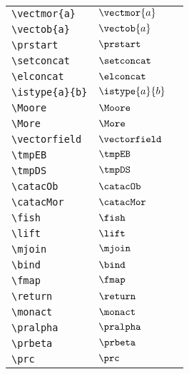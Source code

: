 \begin{longtable}{lll}
 {\color[rgb]{0.5,0.5,0.5}\texttt{\textbackslash vectmor\{a\}}} & $\vectmor{a}$ & \\ 
 {\color[rgb]{0.5,0.5,0.5}\texttt{\textbackslash vectob\{a\}}} & $\vectob{a}$ & \\ 
 {\color[rgb]{0.5,0.5,0.5}\texttt{\textbackslash prstart}} & $\prstart$ & \\ 
 {\color[rgb]{0.5,0.5,0.5}\texttt{\textbackslash setconcat}} & $\setconcat$ & \\ 
 {\color[rgb]{0.5,0.5,0.5}\texttt{\textbackslash elconcat}} & $\elconcat$ & \\ 
 {\color[rgb]{0.5,0.5,0.5}\texttt{\textbackslash istype\{a\}\{b\}}} & $\istype{a}{b}$ & \\ 
 {\color[rgb]{0.5,0.5,0.5}\texttt{\textbackslash Moore}} & $\Moore$ & \\ 
 {\color[rgb]{0.5,0.5,0.5}\texttt{\textbackslash More}} & $\More$ & \\ 
 {\color[rgb]{0.5,0.5,0.5}\texttt{\textbackslash vectorfield}} & $\vectorfield$ & \\ 
 {\color[rgb]{0.5,0.5,0.5}\texttt{\textbackslash tmpEB}} & $\tmpEB$ & \\ 
 {\color[rgb]{0.5,0.5,0.5}\texttt{\textbackslash tmpDS}} & $\tmpDS$ & \\ 
 {\color[rgb]{0.5,0.5,0.5}\texttt{\textbackslash catacOb}} & $\catacOb$ & \\ 
 {\color[rgb]{0.5,0.5,0.5}\texttt{\textbackslash catacMor}} & $\catacMor$ & \\ 
 {\color[rgb]{0.5,0.5,0.5}\texttt{\textbackslash fish}} & $\fish$ & \\ 
 {\color[rgb]{0.5,0.5,0.5}\texttt{\textbackslash lift}} & $\lift$ & \\ 
 {\color[rgb]{0.5,0.5,0.5}\texttt{\textbackslash mjoin}} & $\mjoin$ & \\ 
 {\color[rgb]{0.5,0.5,0.5}\texttt{\textbackslash bind}} & $\bind$ & \\ 
 {\color[rgb]{0.5,0.5,0.5}\texttt{\textbackslash fmap}} & $\fmap$ & \\ 
 {\color[rgb]{0.5,0.5,0.5}\texttt{\textbackslash return}} & $\return$ & \\ 
 {\color[rgb]{0.5,0.5,0.5}\texttt{\textbackslash monact}} & $\monact$ & \\ 
 {\color[rgb]{0.5,0.5,0.5}\texttt{\textbackslash pralpha}} & $\pralpha$ & \\ 
 {\color[rgb]{0.5,0.5,0.5}\texttt{\textbackslash prbeta}} & $\prbeta$ & \\ 
 {\color[rgb]{0.5,0.5,0.5}\texttt{\textbackslash prc}} & $\prc$ & \\ 

\end{longtable}
